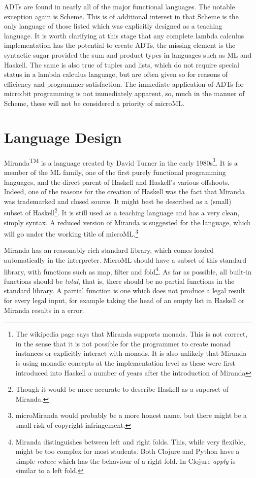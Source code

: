 \documentclass[12pt, a4paper]{report}
\begin{document}
\gls{ADT}s are found in nearly all of the major functional languages. The notable
exception again is Scheme. This is of additional interest in that Scheme is the only language of
those listed which was explicitly designed as a teaching language. It is worth clarifying at this
stage that any complete lambda calculus implementation has the potential to create ADTs, the missing
element is the syntactic sugar provided the sum and product types in languages such as ML and
Haskell. The same is also true of tuples and lists, which do not require special status in a
lambda calculus language, but are often given so for reasons of efficiency and programmer
satisfaction. The immediate application of ADTs for micro:bit programming is not immediately
apparent, so, much in the manner of Scheme, these will not be considered a priority of microML\@.

\section{Language Design} 
\label{sec:lang}
Miranda\textsuperscript{TM} is a language
created by David Turner in the early 1980s\footnote{The wikipedia page says that Miranda supports
monads. This is not correct, in the sense that it is not possible for the programmer to create
monad instances or explicitly interact with monads. It is also unlikely that Miranda is using
monadic concepts at the implementation level as these were first introduced into Haskell a number of
years after the introduction of Miranda}. It is a member of the ML family, one of the first purely
functional programming languages, and the direct parent of Haskell and Haskell's various offshoots.
Indeed, one of the reasons for the creation of Haskell was the fact that Miranda was trademarked and
closed source. It might best be described as a (small) subset of Haskell\footnote{Though it would
be more accurate to describe Haskell as a superset of Miranda.}. It is still used as a teaching
language and has a very clean, simply syntax. A reduced version of Miranda is suggested for 
the language, which will go under the working title of microML.\footnote{microMiranda would probably be
a more honest name, but there might be a small risk of copyright infringement.}

Miranda has an reasonably rich standard library, which comes loaded automatically in the
interpreter. MicroML should have a subset of this standard library, with functions such as
map, filter and fold\footnote{Miranda distinguishes between left and right folds. This, while
very flexible, might be too complex for most students. Both Clojure and Python have a simple
\textit{reduce} which has the behaviour of a right fold. In Clojure \textit{apply} is similar to
a left fold.}. As far as possible, all built-in functions should be \textit{total}, that is, there
should be no partial functions in the standard library. A partial function is one which does not
produce a legal result for every legal input, for example taking the head of an empty list in
Haskell or Miranda results in a error.
\end{document}
